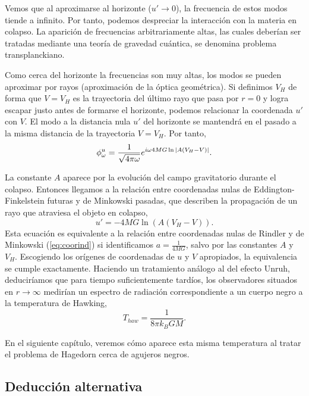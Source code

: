 Vemos que al aproximarse al horizonte ($u'\to 0$), la frecuencia de estos modos tiende a infinito.
Por tanto, podemos despreciar la interacción con la materia en colapso.
La aparición de frecuencias arbitrariamente altas, las cuales deberían ser tratadas mediante
una teoría de gravedad cuántica, se denomina problema transplanckiano.

Como cerca del horizonte la frecuencias son muy altas, los modos se pueden aproximar por rayos (aproximación de la óptica geométrica).
Si definimos $V_H$ de forma que $V=V_H$ es la trayectoria del último rayo que pasa por $r=0$
y logra escapar justo antes de formarse el horizonte, podemos relacionar la coordenada
$u'$ con $V$.
El modo a la distancia nula $u'$ del horizonte se mantendrá en el pasado a la misma distancia de la trayectoria $V=V_H$.
Por tanto,
\begin{equation}
  \phi^{u}_\omega = \frac{1}{\sqrt{4\pi\omega}}e^{i\omega 4MG\ln \abs{A(V_H-V)}}.
\end{equation}

La constante $A$ aparece por la evolución del campo gravitatorio durante el colapso.
Entonces llegamos a la relación entre coordenadas nulas de Eddington-Finkelstein futuras y de Minkowski pasadas,
que describen la propagación de un rayo que atraviesa el objeto en colapso,
\begin{equation}
  u'=-4MG\ln (A(V_H-V)).
\end{equation}
Esta ecuación es equivalente a la relación entre coordenadas nulas de Rindler y de Minkowski (\ref{eq:coorind}) si identificamos $a=\frac{1}{4MG}$, salvo por las constantes $A$ y $V_H$.
Escogiendo los orígenes de coordenadas de $u$ y $V$ apropiados, la equivalencia se cumple exactamente.
Haciendo un tratamiento análogo al del efecto Unruh, deduciríamos que para tiempo suficientemente tardíos,
los observadores situados en $r\to\infty$ medirían un espectro de radiación correspondiente a un 
cuerpo negro a la temperatura de Hawking,
\begin{equation}
  T_{haw}=\frac{1}{8\pi k_B G M}.
\end{equation}

En el siguiente capítulo, veremos cómo aparece esta misma temperatura al tratar el problema de Hagedorn
cerca de agujeros negros.

\subsection{Deducción alternativa}

